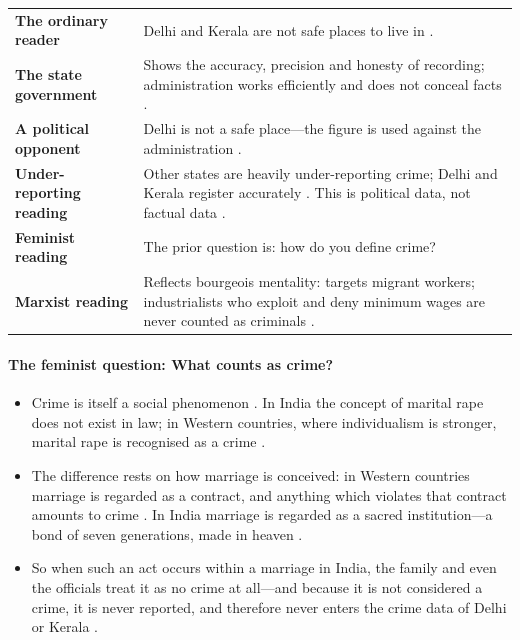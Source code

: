 \vspace{6pt}
\noindent
\begin{tabularx}{\textwidth}{p{3.8cm} Y}
\toprule
{}
 &  \\
\midrule
\textbf{The ordinary reader} & Delhi and Kerala are not safe places to live in . \\
\textbf{The state government} & Shows the accuracy, precision and honesty of recording; administration works efficiently and does not conceal facts . \\
\textbf{A political opponent} & Delhi is not a safe place---the figure is used against the administration . \\
\textbf{Under-reporting reading} & Other states are heavily under-reporting crime; Delhi and Kerala register accurately . This is political data, not factual data . \\
\textbf{Feminist reading} & The prior question is: how do you define crime?  \\
\textbf{Marxist reading} & Reflects bourgeois mentality: targets migrant workers; industrialists who exploit and deny minimum wages are never counted as criminals . \\
\bottomrule
\end{tabularx}
\vspace{6pt}

\paragraph{The feminist question: What counts as crime?}
\begin{itemize}
    \item Crime is itself a social phenomenon . In India the concept of marital rape does not exist in law; in Western countries, where individualism is stronger, marital rape is recognised as a crime .
    \item The difference rests on how marriage is conceived: in Western countries marriage is regarded as a contract, and anything which violates that contract amounts to crime . In India marriage is regarded as a sacred institution---a bond of seven generations, made in heaven .
    \item So when such an act occurs within a marriage in India, the family and even the officials treat it as no crime at all---and because it is not considered a crime, it is never reported, and therefore never enters the crime data of Delhi or Kerala .
\end{itemize}

